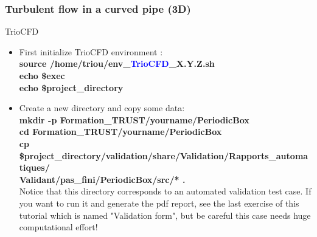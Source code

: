 \documentclass[10pt, hyperref={unicode=true,pdfusetitle, bookmarks=true,bookmarksnumbered=false,bookmarksopen=false, breaklinks=false,pdfborder={0 0 1},backref=true,colorlinks=true,linkcolor=darkblue,pageanchor}]{beamer}
\begin{document}
\begin{frame}
\frametitle{Turbulent flow in a curved pipe (3D)}
\begin{block}{TrioCFD}

\begin{itemize}
\item First initialize TrioCFD environment :\\
{\small{
\textbf{source /home/triou/env\_\textcolor{blue}{TrioCFD}\_X.Y.Z.sh }\\
\textbf{echo \$exec} \\
\textbf{echo \$project\_directory} \\
}}

\item Create a new directory and copy some data:\\
{\small{
\textbf{mkdir -p Formation\_TRUST/yourname/PeriodicBox} \\
\textbf{cd Formation\_TRUST/yourname/PeriodicBox} \\
\textbf{cp \$project\_directory/validation/share/Validation/Rapports\_automatiques/} \\
\hspace{4cm} \textbf{Validant/pas\_fini/PeriodicBox/src/* \; .} \\
}}
\vspace{0.2cm}
Notice that this directory corresponds to an automated validation test case. 
If you want to run it and generate the pdf report, see the last exercise of this tutorial which is named "Validation form", but be careful this case needs huge computational effort!
\end{itemize}

\end{block}
\end{frame}
\end{document}
